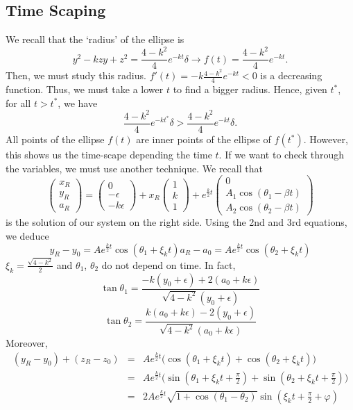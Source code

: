 \documentclass[a4paper,preprint,11pt]{article}
\begin{document}
\subsection{Time Scaping}
We recall that the `radius' of the ellipse is
$$
y^2-kzy+z^2 = \frac{4-k^2}{4}e^{-kt}\delta \rightarrow f(t)=\frac{4-k^2}{4}e^{-kt}.
$$
Then, we must study this radius. $f'(t)=-k\frac{4-k^2}{4}e^{-kt}<0$ is a decreasing function. Thus, we must take a lower $t$ to find a bigger radius.
Hence, given $t^*$, for all $t>t^*$, we have
$$
\frac{4-k^2}{4}e^{-kt^*}\delta > \frac{4-k^2}{4}e^{-kt}\delta.
$$ 
All points of the ellipse $f(t)$ are inner points of the ellipse of $f(t^*)$. However, this shows us the time-scape depending the time $t$. If we want to check through the variables, we must use another technique. We recall that
\begin{equation}\label{eq.x01}
\begin{pmatrix} x_R \\ y_R \\ a_R \end{pmatrix} =
\begin{pmatrix} 0 \\ -\epsilon \\ -k\epsilon \end{pmatrix} +
 x_R \begin{pmatrix} 1 \\ k \\ 1 \end{pmatrix} +e^{\frac k 2 t}
 \begin{pmatrix} 0 \\ A_1 \cos(\theta_1-\beta t) \\ A_2 \cos(\theta_2-\beta t)\end{pmatrix}
\end{equation}
is the solution of our system on the right side. Using the 2nd and 3rd equations, we deduce
$$
y_R-y_0 = Ae^{\frac{k}{2}t}\cos(\theta_1+\xi_k t)
a_R-a_0 = Ae^{\frac{k}{2}t}\cos(\theta_2+\xi_k t)
$$
$\xi_k=\frac{\sqrt{4-k^2}}{2}$ and $\theta_1$, $\theta_2$ do not depend on time. In fact,
$$
\tan\theta_1 = \frac{-k(y_0+\epsilon)+2(a_0+k\epsilon)}{\sqrt{4-k^2}(y_0+\epsilon)}
$$
$$
\tan\theta_2 = \frac{k(a_0+k\epsilon)-2(y_0+\epsilon)}{\sqrt{4-k^2}(a_0+k\epsilon)}
$$
Moreover,
$$
\begin{array}{ccl}
(y_R-y_0)+(z_R-z_0) & = & Ae^{\frac{k}{2}t}\Big(\cos(\theta_1+\xi_k t) + \cos(\theta_2+\xi_k t)\Big) \\
& = & Ae^{\frac{k}{2}t}\Big(\sin(\theta_1+\xi_k t+\frac{\pi}{2}) + \sin(\theta_2+\xi_k t+\frac{\pi}{2})\Big) \\
& = & 2Ae^{\frac{k}{2}t}\sqrt{1+\cos(\theta_1-\theta_2)}\sin(\xi_kt+\frac{\pi}{2} + \varphi)
\end{array}
$$
\end{document}
